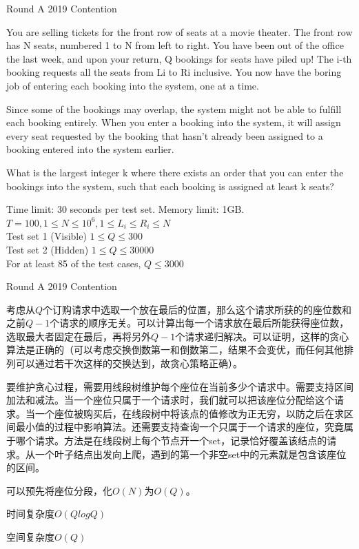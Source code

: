 \documentclass{beamer}
\begin{document}
\begin{frame}{Round A 2019 Contention}

    You are selling tickets for the front row of seats at a movie theater. The front row has N seats, numbered 1 to N from left to right. You have been out of the office the last week, and upon your return, Q bookings for seats have piled up! The i-th booking requests all the seats from Li to Ri inclusive. You now have the boring job of entering each booking into the system, one at a time.

    Since some of the bookings may overlap, the system might not be able to fulfill each booking entirely. When you enter a booking into the system, it will assign every seat requested by the booking that hasn't already been assigned to a booking entered into the system earlier.
    
    What is the largest integer k where there exists an order that you can enter the bookings into the system, such that each booking is assigned at least k seats?
    
    Time limit: 30 seconds per test set. Memory limit: 1GB.\\
    $T=100,1\leq N\leq 10^6,1\leq L_i\leq R_i\leq N$\\
    Test set 1 (Visible) $1\leq Q\leq 300$\\
    Test set 2 (Hidden) $1\leq Q\leq 30000$\\
    For at least 85 of the test cases, $Q\leq 3000$

\end{frame}

\begin{frame}{Round A 2019 Contention}

    考虑从$Q$个订购请求中选取一个放在最后的位置，那么这个请求所获的的座位数和之前$Q-1$个请求的顺序无关。可以计算出每一个请求放在最后所能获得座位数，选取最大者固定在最后，再将另外$Q-1$个请求递归解决。可以证明，这样的贪心算法是正确的（可以考虑交换倒数第一和倒数第二，结果不会变优，而任何其他排列可以通过若干次这样的交换达到，故贪心策略正确）。

    要维护贪心过程，需要用线段树维护每个座位在当前多少个请求中。需要支持区间加法和减法。当一个座位只属于一个请求时，我们就可以把该座位分配给这个请求。当一个座位被购买后，在线段树中将该点的值修改为正无穷，以防之后在求区间最小值的过程中影响算法。还需要支持查询一个只属于一个请求的座位，究竟属于哪个请求。方法是在线段树上每个节点开一个set，记录恰好覆盖该结点的请求。从一个叶子结点出发向上爬，遇到的第一个非空set中的元素就是包含该座位的区间。
    
    可以预先将座位分段，化$O(N)$为$O(Q)$。
    
    时间复杂度$O(QlogQ)$
    
    空间复杂度$O(Q)$
    
\end{frame}
\end{document}
